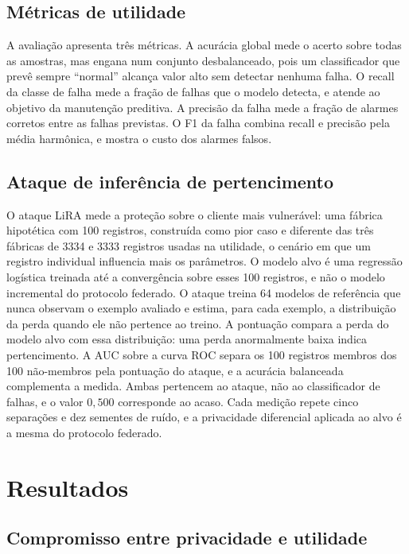 \documentclass[12pt]{article}
\begin{document}
\subsection{Métricas de utilidade}

A avaliação apresenta três métricas. A acurácia global mede o acerto sobre todas as
amostras, mas engana num conjunto desbalanceado, pois um classificador que prevê
sempre ``normal'' alcança valor alto sem detectar nenhuma falha. O recall da classe
de falha mede a fração de falhas que o modelo detecta, e atende ao objetivo da
manutenção preditiva. A precisão da falha mede a fração de alarmes corretos entre as falhas previstas. O F1 da falha combina recall e precisão pela média harmônica, e mostra o custo dos alarmes falsos.

\subsection{Ataque de inferência de pertencimento}

O ataque LiRA mede a proteção sobre o cliente mais vulnerável: uma fábrica hipotética com
100 registros, construída como pior caso e diferente das três fábricas de 3334 e 3333
registros usadas na utilidade, o cenário em que um registro individual influencia mais os
parâmetros. O modelo alvo é uma regressão logística treinada até a convergência sobre esses
100 registros, e não o modelo incremental do protocolo federado. O
ataque treina 64 modelos de referência que nunca observam o exemplo avaliado e
estima, para cada exemplo, a distribuição da perda quando ele não pertence ao treino.
A pontuação compara a perda do modelo alvo com essa distribuição: uma perda anormalmente
baixa indica pertencimento. A AUC sobre a curva ROC separa os 100 registros membros dos 100 não-membros pela pontuação do ataque, e a acurácia balanceada complementa a medida. Ambas pertencem ao ataque, não ao classificador de falhas, e o valor $0{,}500$ corresponde ao acaso. Cada medição repete cinco
separações e dez sementes de ruído, e a privacidade diferencial aplicada ao alvo é a
mesma do protocolo federado.

\section{Resultados} \label{sec:results}

\subsection{Compromisso entre privacidade e utilidade}
\end{document}
